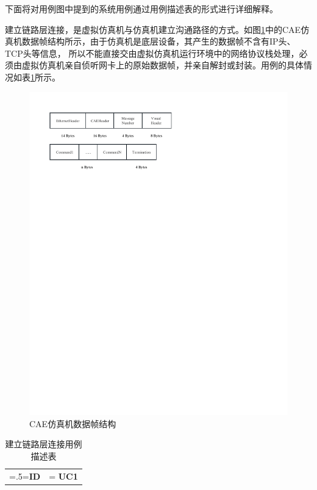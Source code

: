 {\par
下面将对用例图中提到的系统用例通过用例描述表的形式进行详细解释。
\par
建立链路层连接，是虚拟仿真机与仿真机建立沟通路径的方式。如图\ref{datastruct}中的CAE仿真机数据帧结构所示，由于仿真机是底层设备，其产生的数据帧不含有IP头、TCP头等信息，
所以不能直接交由虚拟仿真机运行环境中的网络协议栈处理，必须由虚拟仿真机亲自侦听网卡上的原始数据帧，并亲自解封或封装。用例的具体情况如表\ref{usecase1}所示。
\begin{figure}[h!]
    \begin{center}
        \includegraphics[width=.8\textwidth]{pictures/datastruct.pdf}
        \caption{CAE仿真机数据帧结构}
        \label{datastruct}
    \end{center}
\end{figure}
\begin{table}[htbp]
    \begin{center}
        \caption{建立链路层连接用例描述表}
        \label{usecase1}
        \renewcommand\arraystretch{1.5}
        \begin{tabularx}{0.8\textwidth}{ 
            | >{\centering\arraybackslash\hsize=.5\hsize\linewidth=\hsize}X 
            | >{\raggedright\arraybackslash\hsize=1.5\hsize\linewidth=\hsize}X 
            | }
            \hline
            \textbf{ID} & \textbf{UC1}\\

\end{tabularx}
\end{center}
\end{table}}
